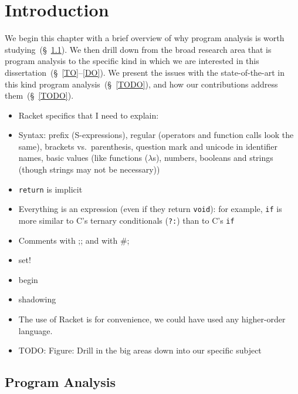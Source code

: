 \documentclass[12pt, oneside]{book}
\begin{document}
\mainmatter

\chapter{Introduction}
\label{section:introduction}

We begin this chapter with a brief overview of why program analysis is worth studying~(§~\ref{section:program-analysis}). We then drill down from the broad research area that is program analysis to the specific kind in which we are interested in this dissertation~(§~\ref{TO}–\ref{DO}). We present the issues with the state-of-the-art in this kind program analysis~(§~\ref{TODO}), and how our contributions address them~(§~\ref{TODO}).

\begin{itemize}
  \item Racket specifics that I need to explain:
  \item Syntax: prefix (S-expressions), regular (operators and function calls look the same), brackets vs.\ parenthesis, question mark and unicode in identifier names, basic values (like functions (\(λ\)s), numbers, booleans and strings (though strings may not be necessary))
  \item \texttt{return} is implicit
  \item Everything is an expression (even if they return \texttt{void}): for example, \texttt{if} is more similar to C’s ternary conditionals (\texttt{?:}) than to C’s \texttt{if}
  \item Comments with ;; and with \#;
  \item set!
  \item begin
  \item shadowing
  \item The use of Racket is for convenience, we could have used any higher-order language.
\end{itemize}

\begin{itemize}
  \item TODO: Figure: Drill in the big areas down into our specific subject
\end{itemize}

\section{Program Analysis}
\label{section:program-analysis}
\end{document}

